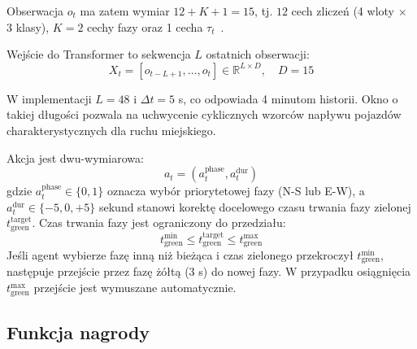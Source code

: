 \documentclass[10pt,a4paper]{article}
\begin{document}
Obserwacja $o_t$ ma zatem wymiar $12 + K + 1 = 15$, tj. $12$ cech zliczeń (4 wloty $\times$ 3 klasy), $K=2$ cechy fazy oraz 1 cecha $\tau_t$~\cite{ref16}.

Wejście do Transformer to sekwencja $L$ ostatnich obserwacji:
\begin{equation}\label{eq:seq}
X_t = [o_{t-L+1}, \dots, o_t] \in \mathbb{R}^{L \times D}, \quad D = 15
\end{equation}

W implementacji $L=48$ i $\Delta t=5$ s, co odpowiada 4 minutom historii. Okno o takiej długości pozwala na uchwycenie cyklicznych wzorców napływu pojazdów charakterystycznych dla ruchu miejskiego.

Akcja jest dwu-wymiarowa:
\begin{equation}\label{eq:action}
a_t = (a_t^{\text{phase}}, a_t^{\text{dur}})
\end{equation}
gdzie $a_t^{\text{phase}} \in \{0,1\}$ oznacza wybór priorytetowej fazy (N-S lub E-W), a $a_t^{\text{dur}} \in \{-5, 0, +5\}$ sekund stanowi korektę docelowego czasu trwania fazy zielonej $t_{\text{green}}^{\text{target}}$. Czas trwania fazy jest ograniczony do przedziału:
\begin{equation}\label{eq:constraints}
t_{\text{green}}^{\text{min}} \leq t_{\text{green}}^{\text{target}} \leq t_{\text{green}}^{\text{max}}
\end{equation}
Jeśli agent wybierze fazę inną niż bieżąca i czas zielonego przekroczył $t_{\text{green}}^{\text{min}}$, następuje przejście przez fazę żółtą (3 s) do nowej fazy. W przypadku osiągnięcia $t_{\text{green}}^{\text{max}}$ przejście jest wymuszane automatycznie.

\subsection{Funkcja nagrody}
\end{document}
